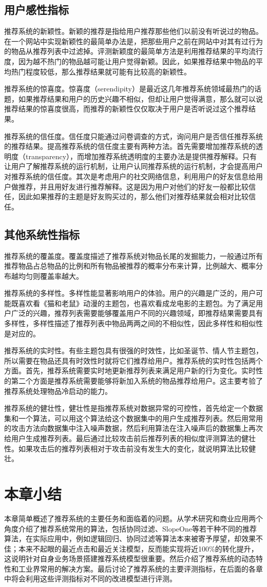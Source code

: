 		\subsection{用户感性指标}
			推荐系统的新颖性。新颖的推荐是指给用户推荐那些他们以前没有听说过的物品。在一个网站中实现新颖性的最简单办法是，把那些用户之前在网站中对其有过行为的物品从推荐列表中过滤掉。评测新颖度的最简单方法是利用推荐结果的平均流行度，因为越不热门的物品越可能让用户觉得新颖。因此，如果推荐结果中物品的平均热门程度较低，那么推荐结果就可能有比较高的新颖性。

			推荐系统的惊喜度。惊喜度（serendipity）是最近这几年推荐系统领域最热门的话题，如果推荐结果和用户的历史兴趣不相似，但却让用户觉得满意，那么就可以说推荐结果的惊喜度很高，而推荐的新颖性仅仅取决于用户是否听说过这个推荐结果。

			推荐系统的信任度。信任度只能通过问卷调查的方式，询问用户是否信任推荐系统的推荐结果。提高推荐系统的信任度主要有两种方法。首先需要增加推荐系统的透明度（transparency），而增加推荐系统透明度的主要办法是提供推荐解释。只有让用户了解推荐系统的运行机制，让用户认同推荐系统的运行机制，才会提高用户对推荐系统的信任度。其次是考虑用户的社交网络信息，利用用户的好友信息给用户做推荐，并且用好友进行推荐解释。这是因为用户对他们的好友一般都比较信任，因此如果推荐的主题是好友购买过的，那么他们对推荐结果就会相对比较信任。

		\subsection{其他系统性指标}
			推荐系统的覆盖度。覆盖度描述了推荐系统对物品长尾的发掘能力，一般通过所有推荐物品占总物品的比例和所有物品被推荐的概率分布来计算，比例越大、概率分布越均匀则覆盖率越大。

			推荐系统的多样性。多样性能显著影响用户的体验。用户的兴趣是广泛的，用户可能既喜欢看《猫和老鼠》动漫的主题包，也喜欢看成龙电影的主题包。为了满足用户广泛的兴趣，推荐列表需要能够覆盖用户不同的兴趣领域，即推荐结果需要具有多样性，多样性描述了推荐列表中物品两两之间的不相似性，因此多样性和相似性是对应的。

			推荐系统的实时性。有些主题包具有很强的时效性，比如圣诞节、情人节主题包，所以需要在物品还具有时效性时就将它们推荐给用户。推荐系统的实时性包括两个方面。首先，推荐系统需要实时地更新推荐列表来满足用户新的行为变化。实时性的第二个方面是推荐系统需要能够将新加入系统的物品推荐给用户。这主要考验了推荐系统处理物品冷启动的能力。

			推荐系统的健壮性，健壮性是指推荐系统对数据异常的可控性，首先给定一个数据集和一个算法，可以用这个算法给这个数据集中的用户生成推荐列表。然后用常用的攻击方法向数据集中注入噪声数据，然后利用算法在注入噪声后的数据集上再次给用户生成推荐列表。最后通过比较攻击前后推荐列表的相似度评测算法的健壮性。如果攻击后的推荐列表相对于攻击前没有发生大的变化，就说明算法比较健壮。

	\section{本章小结}
	本章简单概述了推荐系统的主要任务和面临着的问题。从学术研究和商业应用两个角度介绍了推荐系统常用的算法，包括协同过滤、SlopeOne等若干种不同的推荐算法，在实际应用中，例如逻辑回归、协同过滤等算法本来被寄予厚望，却效果不佳；本来不起眼的最近点击和最近关注模型，反而能实现将近100\%的转化提升，这说明针对自身业务场景搭建推荐系统模型很重要。然后介绍了推荐系统的动态特性和工业界常用的解决方案。最后讨论了推荐系统的主要评测指标，在后面的各章中将会利用这些评测指标对不同的改进模型进行评测。